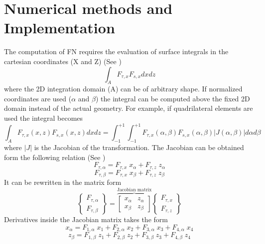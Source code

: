 \documentclass[a4paper,12pt]{article}
\begin{document}
\section*{Numerical methods and Implementation}
\indent\indent\indent\indent The computation of FN requires the evaluation of surface integrals in the cartesian coordinates (X and Z) (See \cite{carrera2014finite})
$$\int_{A}^{} F_{\tau,x} F_{s,x} dx dz $$ where the 2D integration domain (A) can be of arbitrary shape. If normalized coordinates are used ($\alpha$ and $\beta$)
the integral can be computed above the fixed 2D domain instead of the actual geometry. For example, if quadrilateral elements are used the integral becomes $$ \int_{A}^{} F_{\tau,x}(x,z) F_{s,x}(x,z)dxdz = \int_{-1}^{+1}\int_{-1}^{+1} F_{\tau,x}(\alpha,\beta) F_{s,x}(\alpha,\beta) |J(\alpha,\beta)| d\alpha  d\beta$$ where $|J|$ is the Jacobian of the transformation. The Jacobian can be obtained form the following relation (See \cite{carrera2014finite}) $$ F_{\tau,\alpha} = F_{\tau,x}\;x_{\alpha} + F_{\tau,z}\; z_{\alpha}$$ $$F_{\tau,\beta} = F_{\tau,x}\;x_{\beta} + F_{\tau,z}\; z_{\beta}$$
It can be rewritten in the matrix form 
$$
\begin{Bmatrix}
F_{\tau,\alpha}\\
F_{\tau,\beta}   
\end{Bmatrix}
=
\overbrace{
\begin{bmatrix}
x_{\alpha} & z_{\alpha} \\
x_{\beta} & z_{\beta}
\end{bmatrix}
}^\text{Jacobian matrix}
\begin{Bmatrix}
F_{\tau,x}\\
F_{\tau,z}   
\end{Bmatrix}
$$
Derivatives inside the Jacobian matrix takes the form 
$$x_{\alpha} = F_{1 ,\alpha}\;x_{1} + F_{2 ,\alpha}\;x_{2} + F_{3 ,\alpha}\;x_{3} + F_{4 ,\alpha}\;x_{4}
$$ $$z_{\beta} = F_{1 ,\beta}\;z_{1} + F_{2 ,\beta}\;z_{2} + F_{3 ,\beta}\;z_{3} + F_{4 ,\beta}\;z_{4}$$\\
\end{document}
